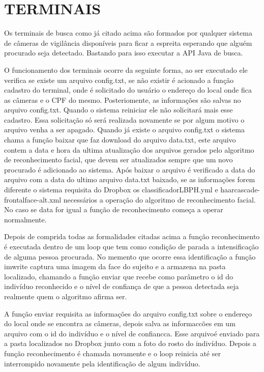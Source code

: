 \documentclass[letterpaper, 10 pt, conference]{ieeeconf}  %
\begin{document}
\section{TERMINAIS}
Os terminais de busca como j\'a citado acima s\~ao formados por qualquer sistema de c\^ameras de vigil\^ancia dispon\'iveis para ficar a espreita esperando que algu\'em procurado seja detectado. Bastando para isso executar a API Java de busca.  

O funcionamento dos terminais ocorre da seguinte forma, ao ser executado ele verifica se existe um arquivo config.txt, se n\~ao existir \'e acionado a fun\c{c}\~ao cadastro do terminal, onde \'e solicitado do usu\'ario o endere\c{c}o do local onde fica as c\^ameras e o CPF do mesmo. Posteriomente, as informa\c{c}\~oes s\~ao salvas no arquivo config.txt. Quando o sistema reiniciar ele n\~ao solicitar\'a mais esse cadastro. Essa solicita\c{c}\~ao s\'o ser\'a realizada novamente se por algum motivo o arquivo venha a ser apagado.  Quando j\'a existe o arquivo config.txt o sistema chama a fun\c{c}\~ao baixar que faz download do arquivo data.txt, este arquivo contem a data e hora da ultima atualiza\c{c}\~ao dos arquivos gerados pelo algoritmo de reconhecimento facial, que devem ser atualizados sempre que um novo procurado \'e adicionado ao sistema. Ap\'os baixar o arquivo \'e verificado a data do arquivo com a data do ultimo arquivo data.txt baixado, se as informa\c{c}\~oes forem diferente o sistema requisita do Dropbox os classificadorLBPH.yml e haarcascade-frontalface-alt.xml necess\'arios a opera\c{c}\~ao do algoritmo de reconhecimento facial. No caso se data for igual a fun\c{c}\~ao de reconhecimento come\c{c}a a operar normalmente.

Depois de comprida todas as formalidades citadas acima a fun\c{c}\~ao reconhecimento \'e executada dentro de um loop que tem como condi\c{c}\~ao de parada a intensifica\c{c}\~ao de alguma pessoa procurada. No memento que ocorre essa identifica\c{c}\~ao a fun\c{c}\~ao imwrite captura uma imagem da face do sujeito e a armazena na pasta localizado, chamando a fun\c{c}\~ao enviar que recebe como par\^ametro o id do indiv\'iduo reconhecido e o n\'ivel de confian\c{c}a de que a pessoa detectada seja realmente quem o algoritmo afirma ser. 

A fun\c{c}\~ao enviar requisita as informa\c{c}\~oes do arquivo config.txt sobre o endere\c{c}o do local onde se encontra as c\^ameras, depois salva as informac{c}\~oes em um arquivo com o id do indiv\'iduo e o n\'ivel de confianc{c}a.  Esse arquivo\'e enviado para a pasta localizados no Dropbox junto com a foto do rosto do indiv\'iduo.  Depois a fun\c{c}\~ao reconhecimento \'e chamada novamente e o loop reinicia at\'e ser interrompido novamente pela identifica\c{c}\~ao de algum indiv\'iduo.
\end{document}
